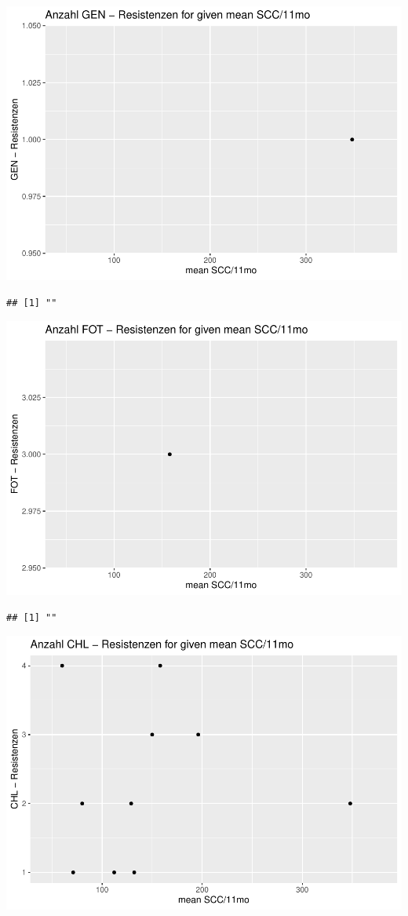 \documentclass[
]{article}
\begin{document}
\includegraphics{NResistenzen_files/figure-latex/numerical_variables-14.pdf}

\begin{verbatim}
## [1] ""
\end{verbatim}

\includegraphics{NResistenzen_files/figure-latex/numerical_variables-15.pdf}

\begin{verbatim}
## [1] ""
\end{verbatim}

\includegraphics{NResistenzen_files/figure-latex/numerical_variables-16.pdf}
\end{document}
